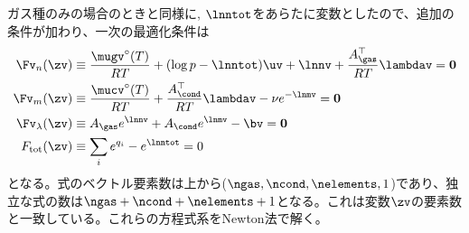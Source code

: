 ガス種のみの場合のときと同様に, $\lnntot$をあらたに変数としたので、追加の条件が加わり、一次の最適化条件は
\begin{align}
\label{eq:akkt1}
\Fv_n (\zv) &\equiv \frac{\mugv^\circ(T)}{RT} + (\log{p} - \lnntot) \uv + \lnnv +  \frac{A_\gas^\top}{R T} \lambdav = \boldsymbol{0}   \\
\label{eq:akkt2}
\Fv_m (\zv) &\equiv \frac{\mucv^\circ (T)}{RT} + \frac{A_\cond^\top}{R T} \lambdav - \nu e^{-\lnmv} = \boldsymbol{0}   \\
\Fv_\lambda (\zv) &\equiv A_\gas e^{\lnnv} + A_\cond e^{\lnmv} - \bv = \boldsymbol{0} \\
\label{eq:akkt4}
F_\mathrm{tot} (\zv) &\equiv \sum_i {e^{q_i}} - e^{\lnntot} = 0
\end{align}
となる。式のベクトル要素数は上から($\ngas, \ncond, \nelements, 1$)であり、独立な式の数は$\ngas + \ncond + \nelements + 1$となる。これは変数$\zv$の要素数と一致している。これらの方程式系をNewton法で解く。

